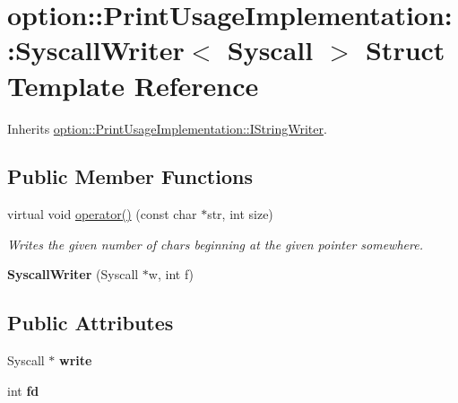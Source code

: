 \hypertarget{structoption_1_1_print_usage_implementation_1_1_syscall_writer}{\section{option\-:\-:\-Print\-Usage\-Implementation\-:\-:\-Syscall\-Writer$<$ \-Syscall $>$ \-Struct \-Template \-Reference}
\label{structoption_1_1_print_usage_implementation_1_1_syscall_writer}
}


\-Inherits \hyperlink{structoption_1_1_print_usage_implementation_1_1_i_string_writer}{option\-::\-Print\-Usage\-Implementation\-::\-I\-String\-Writer}.

\subsection*{\-Public \-Member \-Functions}
\begin{DoxyCompactItemize}
\item 
\hypertarget{structoption_1_1_print_usage_implementation_1_1_syscall_writer_a61c1c010d9b67affd5f1208f0a3e9cf0}{virtual void \hyperlink{structoption_1_1_print_usage_implementation_1_1_syscall_writer_a61c1c010d9b67affd5f1208f0a3e9cf0}{operator()} (const char $\ast$str, int size)}\label{structoption_1_1_print_usage_implementation_1_1_syscall_writer_a61c1c010d9b67affd5f1208f0a3e9cf0}

\begin{DoxyCompactList}\small\item\em \-Writes the given number of chars beginning at the given pointer somewhere. \end{DoxyCompactList}\item 
\hypertarget{structoption_1_1_print_usage_implementation_1_1_syscall_writer_ae4f8677dbd79b0a9238368e28014701a}{{\bfseries \-Syscall\-Writer} (\-Syscall $\ast$w, int f)}\label{structoption_1_1_print_usage_implementation_1_1_syscall_writer_ae4f8677dbd79b0a9238368e28014701a}

\end{DoxyCompactItemize}
\subsection*{\-Public \-Attributes}
\begin{DoxyCompactItemize}
\item 
\hypertarget{structoption_1_1_print_usage_implementation_1_1_syscall_writer_adc72b04cd74c69d0219b8b26589b8e5e}{\-Syscall $\ast$ {\bfseries write}}\label{structoption_1_1_print_usage_implementation_1_1_syscall_writer_adc72b04cd74c69d0219b8b26589b8e5e}

\item 
\hypertarget{structoption_1_1_print_usage_implementation_1_1_syscall_writer_ae79409e3f85f8dbaa7ef87bb8d7fcf8a}{int {\bfseries fd}}\label{structoption_1_1_print_usage_implementation_1_1_syscall_writer_ae79409e3f85f8dbaa7ef87bb8d7fcf8a}

\end{DoxyCompactItemize}
